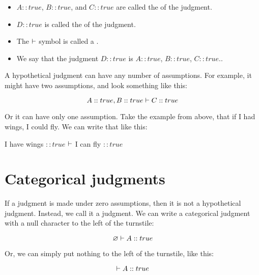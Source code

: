 \documentclass[../../../main.tex]{subfiles}
\begin{document}
\begin{itemize}
  \item{$A :: true$, $B :: true$, and $C :: true$ are called the  of the judgment.}
  \item{$D :: true$ is called the  of the judgment.}
  \item{The $\ndturnstile/$ symbol is called a .}
  \item{We say that the judgment $D :: true$ is  $A :: true$, $B :: true$, $C :: true$.}.
\end{itemize}

\noindent
A hypothetical judgment can have any number of assumptions. For example, it might have two assumptions, and look something like this:

\begin{equation*}
  A :: true, B :: true \ndturnstile/ C :: true
\end{equation*}

\noindent
Or it can have only one assumption. Take the example from above, that if I had wings, I could fly. We can write that like this:

\begin{center}
  I have wings $:: true$ $\ndturnstile/$ I can fly $:: true$
\end{center}


\section{Categorical judgments}

If a judgment is made under zero assumptions, then it is not a hypothetical judgment. Instead, we call it a  judgment. We can write a categorical judgment with a null character to the left of the turnstile:

\begin{equation*}
  \varnothing \ndturnstile/ A :: true
\end{equation*}

\noindent
Or, we can simply put nothing to the left of the turnstile, like this:

\begin{equation*}
  \ndturnstile/ A :: true
\end{equation*}


\end{document}
